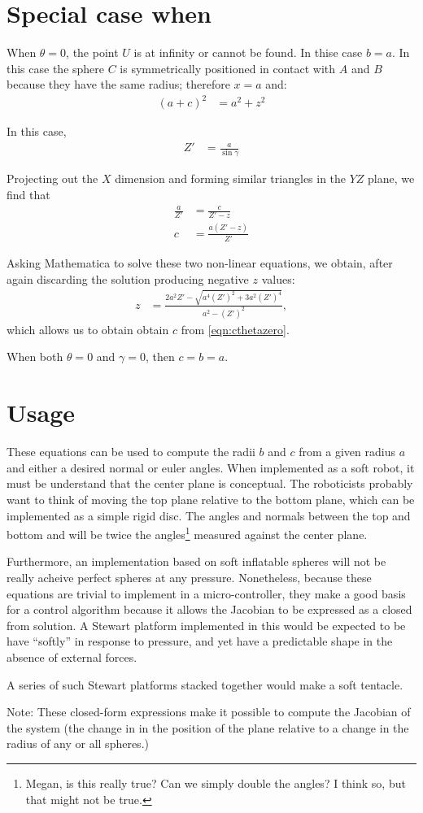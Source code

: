 \documentclass{article}
\begin{document}
\section{Special case when }

When $\theta = 0$, the point $U$ is at infinity or
cannot be found. In thise case $b = a$.
In this case the sphere $C$ is symmetrically
positioned in contact with $A$ and $B$ because
they have the same radius; therefore $x = a$ and:
\begin{align}
(a + c)^2 &= a^2 + z^2
\end{align}

In this case,
\begin{align}
Z' &= \frac{a}{\sin{\gamma}}
\end{align}

Projecting out the $X$ dimension and forming
similar triangles in the $YZ$ plane, we find that
\begin{align}
  \frac{a}{Z'} &= \frac{c}{Z'-z} \\
  c &= \frac{a( Z' -z )}{Z'} \label{eqn:cthetazero}
\end{align}

Asking Mathematica to solve these two non-linear equations, we obtain,
after again discarding the solution producing negative $z$ values:
\begin{align}
 z &=  \frac{2 a^2 Z' - \sqrt{a^4 (Z')^2 + 3 a^2 (Z')^4}}{a^2 - (Z')^2},
\end{align}
which allows us to obtain obtain $c$ from \ref{eqn:cthetazero}.

When both $\theta = 0$ and $\gamma = 0$, then $c = b = a$.

\section{Usage}

These equations can be used to compute the radii $b$ and $c$
from a given radius $a$ and either a desired normal or euler
angles. When implemented as a soft robot, it must be understand
that the center plane is conceptual. The roboticists probably
want to think of moving the top plane relative to the bottom plane,
which can be implemented as a simple rigid disc.
The angles and normals between the top and bottom and will be
twice the angles\footnote{Megan, is this really true? Can we simply double the angles? I think so, but that might not be true.} measured against the center plane.

Furthermore, an implementation based on soft inflatable spheres
will not be really acheive perfect spheres at any pressure.
Nonetheless, because these equations are trivial to implement
in a micro-controller, they make a good basis for a control
algorithm because it allows the Jacobian to be expressed as a
closed from solution. A Stewart platform implemented in this would
be expected to be have ``softly'' in response to pressure,
and yet have a predictable shape in the absence of external
forces.

A series of such Stewart platforms stacked together would make
a soft tentacle.

Note: These closed-form expressions make it possible to compute the Jacobian of the system (the change in in the position
of the plane relative to a change in the radius of any or all spheres.)

\printbibliography
\end{document}
